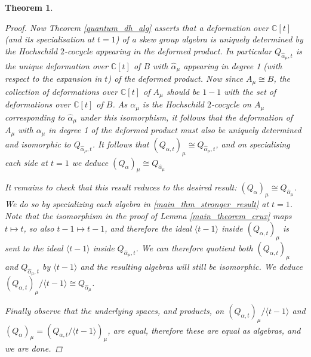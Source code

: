 \documentclass[10pt]{article}
\newcommand{\bb}{\medbreak}
\newcommand{\nt}{\noindent}
\newcommand{\Cc }{\mathbb{C}}
\newcommand{\rt}{\xrightarrow{}}
\newcommand{\id}{\text{id}}
\newtheorem{theorem}[lemma]{Theorem}
\theoremstyle{definition}
\begin{document}
\begin{theorem}
\begin{proof}
\nt Now Theorem \ref{quantum_dh_alg} asserts that a deformation over $\Cc[t]$ (and its specialisation at $t=1$) of a skew group algebra is uniquely determined by the Hochschild $2$-cocycle appearing in the deformed product. In particular $Q_{\hat{\alpha}_\mu,t}$ is the unique deformation over $\Cc[t]$ of $B$ with $\hat{\alpha}_\mu$ appearing in degree 1 (with respect to the expansion in $t$) of the deformed product. Now since $A_\mu\cong B$, the collection of deformations over $\Cc[t]$ of $A_\mu$ should be $1-1$ with the set of deformations over $\Cc[t]$ of $B$. As $\alpha_\mu$ is the Hochschild $2$-cocycle on $A_\mu$ corresponding to $\hat{\alpha}_\mu$ under this isomorphism, it follows that the deformation of $A_\mu$ with $\alpha_\mu$ in degree 1 of the deformed product must also be uniquely determined and isomorphic to $Q_{\hat{\alpha}_\mu,t}$. It follows that $(Q_{\alpha,t})_\mu\cong Q_{\hat{\alpha}_\mu,t}$, and on specialising each side at $t=1$ we deduce $(Q_{\alpha})_\mu\cong Q_{\hat{\alpha}_\mu}$
\fi

\nt It remains to check that this result reduces to the desired result: $(Q_\alpha)_\mu\cong Q_{\hat \alpha_\mu}$. We do so by specializing each algebra in \eqref{main_thm_stronger_result} at $t=1$. Note that the isomorphism in the proof of Lemma \ref{main_theorem_crux} maps $t\mapsto t$, so also $t-1\mapsto t-1$, and therefore the ideal $\langle t-1 \rangle$ inside $(Q_{\alpha,t})_\mu$ is sent to the ideal $\langle t-1\rangle$ inside $Q_{\hat \alpha_\mu,t}$. We can therefore quotient both $(Q_{\alpha,t})_\mu$ and $Q_{\hat \alpha_\mu,t}$ by $\langle t-1\rangle$ and the resulting algebras will still be isomorphic. We deduce $(Q_{\alpha,t})_\mu/\langle t-1\rangle\cong Q_{\hat \alpha_\mu}$.\bb

\nt Finally observe that the underlying spaces, and products, on $(Q_{\alpha,t})_\mu/\langle t-1\rangle$ and $(Q_\alpha)_\mu=(Q_{\alpha,t}/\langle t-1\rangle)_\mu$, are equal, therefore these are equal as algebras, and we are done.



\end{proof}
\end{theorem}
\end{document}
